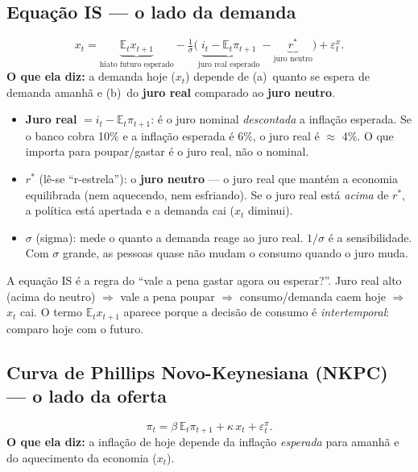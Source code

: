 \documentclass[11pt,a4paper]{article}
\begin{document}
\subsection{Equação IS --- o lado da demanda}
\[
x_t = \underbrace{\mathbb{E}_t x_{t+1}}_{\text{hiato futuro esperado}} - \tfrac{1}{\sigma}\big(\underbrace{i_t - \mathbb{E}_t\pi_{t+1}}_{\text{juro real esperado}} - \underbrace{r^\ast}_{\text{juro neutro}}\big) + \varepsilon^x_t.
\]
\textbf{O que ela diz:} a demanda hoje ($x_t$) depende de (a)~quanto se espera de demanda amanhã e
(b)~do \textbf{juro real} comparado ao \textbf{juro neutro}.

\begin{itemize}[nosep]
  \item \textbf{Juro real} $= i_t - \mathbb{E}_t\pi_{t+1}$: é o juro nominal \emph{descontada} a
        inflação esperada. Se o banco cobra 10\% e a inflação esperada é 6\%, o juro real é $\approx$
        4\%. O que importa para poupar/gastar é o juro real, não o nominal.
  \item $r^\ast$ (lê-se ``r-estrela''): o \textbf{juro neutro} --- o juro real que mantém a economia
        equilibrada (nem aquecendo, nem esfriando). Se o juro real está \emph{acima} de $r^\ast$, a
        política está apertada e a demanda cai ($x_t$ diminui).
  \item $\sigma$ (sigma): mede o quanto a demanda reage ao juro real. $1/\sigma$ é a sensibilidade.
        Com $\sigma$ grande, as pessoas quase não mudam o consumo quando o juro muda.
\end{itemize}

\begin{intuicao}
A equação IS é a regra do ``vale a pena gastar agora ou esperar?''. Juro real alto (acima do neutro)
$\Rightarrow$ vale a pena poupar $\Rightarrow$ consumo/demanda caem hoje $\Rightarrow$ $x_t$ cai. O
termo $\mathbb{E}_t x_{t+1}$ aparece porque a decisão de consumo é \emph{intertemporal}: comparo hoje
com o futuro.
\end{intuicao}

\subsection{Curva de Phillips Novo-Keynesiana (NKPC) --- o lado da oferta}
\[
\pi_t = \beta\,\mathbb{E}_t\pi_{t+1} + \kappa\,x_t + \varepsilon^\pi_t.
\]
\textbf{O que ela diz:} a inflação de hoje depende da inflação \emph{esperada} para amanhã e do
aquecimento da economia ($x_t$).
\end{document}
